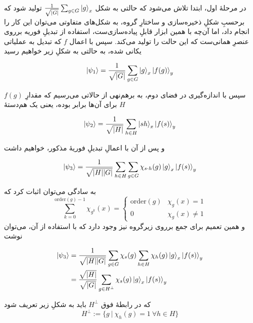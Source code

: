 در مرحلهٔ اول، ابتدا تلاش می‌شود که حالتی به شکل
\(\frac{1}{\sqrt{\abs{G}}}\sum_{g \in G} \ket{g}_x\)
تولید شود که برحسبِ شکلِ ذخیره‌سازی و ساختارِ گروه، به شکل‌های متفاوتی می‌توان این کار را انجام داد، اما آن‌چه با همین ابزار قابلِ پیاده‌سازی‌ست، استفاده از تبدیلِ فوریه برروی عنصرِ همانی‌ست که این حالت را تولید می‌کند. سپس با اعمال \(f\) که تبدیل به عملیاتی یکانی شده، به حالتی به شکلِ زیر خواهیم رسید

\begin{equation}
    \ket{\psi_1} = \frac{1}{\sqrt{\abs{G}}}\sum_{g \in G} \ket{g}_x\ket{f(g)}_y
\end{equation}

سپس با اندازه‌گیری در فضای دوم، به برهم‌نهی از حالاتی می‌رسیم که مقدارِ 
\(f(g)\)
برای آن‌ها برابر بوده، یعنی یک هم‌دستهٔ \(H\)

\begin{equation}
    \ket{\psi_2} = \frac{1}{\sqrt{\abs{H}}} \sum_{h \in H} \ket{sh}_x \ket{f(s)}_y
\end{equation}

و پس از آن با اعمالِ تبدیلِ فوریهٔ مذکور، خواهیم داشت

\begin{equation}
    \ket{\psi_3} = \frac{1}{\sqrt{\abs{H} \abs{G}}} \sum_{h \in H} \sum_{g \in G} \chi_{s \cdot h}(g)\ket{g}_x \ket{f(s)}_y
\end{equation}

به سادگی می‌توان اثبات کرد که 
\begin{equation}
    \sum_{k = 0}^{\mathrm{order}(g) - 1} \chi_{g^k}(x) = \begin{cases} \mathrm{order}(g) & \chi_g(x) = 1 \\
0 & \chi_g(x) \ne 1 \end{cases}
\end{equation}
و همین تعمیم برای جمع برروی زیرگروه نیز وجود دارد که با استفاده از آن، می‌توان نوشت 

\begin{align}
    \ket{\psi_3} &= \frac{1}{\sqrt{\abs{H} \abs{G}}} \sum_{g \in G} \chi_s(g) \sum_{h \in H} \chi_{h}(g)\ket{g}_x \ket{f(s)}_y \\
    &= \frac{\sqrt{\abs{H}}}{\sqrt{\abs{G}}} \sum_{g \in H^\perp} \chi_s(g) \ket{g}_x \ket{f(s)}_y
\end{align}

که در رابطهٔ فوق \(H^\perp\) باید به شکلِ زیر تعریف شود
\begin{equation}
    H^\perp := \{g ~|~ \chi_h(g) = 1 ~ \forall h \in H\}
\end{equation}


